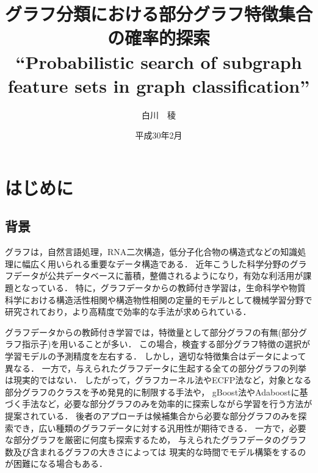\documentclass[12pt,fleqn]{jsotsuron}
\title{グラフ分類における部分グラフ特徴集合の確率的探索\\
``Probabilistic search of subgraph feature sets in graph classification''}
\author{白川　稜}
\date{平成30年2月}
\begin{document}
\maketitle
\tableofcontents
\newpage


\chapter{はじめに}
\section{背景}
グラフは，自然言語処理\cite{Adaboost}，RNA二次構造\cite{DBLP:conf/psb/KarklinMH05}，低分子化合物の構造式\cite{Takigawa201350}などの知識処理に幅広く用いられる重要なデータ構造である．
近年こうした科学分野のグラフデータが公共データベースに蓄積，整備されるようになり，有効な利活用が課題となっている．
特に，グラフデータからの教師付き学習は，生命科学や物質科学における構造活性相関や構造物性相関の定量的モデルとして機械学習分野で研究されており，より高精度で効率的な手法が求められている．

グラフデータからの教師付き学習では，特徴量として部分グラフの有無(部分グラフ指示子)を用いることが多い．
この場合，検査する部分グラフ特徴の選択が学習モデルの予測精度を左右する．
しかし，適切な特徴集合はデータによって異なる．
一方で，与えられたグラフデータに生起する全ての部分グラフの列挙は現実的ではない．
したがって，グラフカーネル法\cite{DBLP:journals/jmlr/ShervashidzeSLMB11}やECFP法\cite{DBLP:journals/jcisd/RogersH10}など，対象となる部分グラフのクラスを予め発見的に制限する手法や，
gBoost法\cite{gBoost}やAdaboostに基づく手法\cite{Adaboost}など，必要な部分グラフのみを効率的に探索しながら学習を行う方法が提案されている．
後者のアプローチは候補集合から必要な部分グラフのみを探索でき，広い種類のグラフデータに対する汎用性が期待できる．
一方で，必要な部分グラフを厳密に何度も探索するため，
与えられたグラフデータのグラフ数及び含まれるグラフの大きさによっては
現実的な時間でモデル構築をするのが困難になる場合もある．
\end{document}
